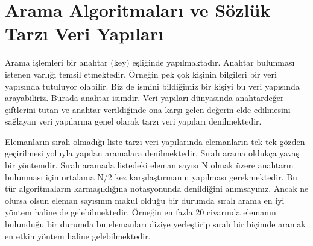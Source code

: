 \documentclass[a4paper,10pt,turkish]{sphinxmanual}
\begin{document}
\begin{sphinxVerbatim}[commandchars=\\\{\}]




\end{sphinxVerbatim}


\section{Arama Algoritmaları ve Sözlük Tarzı Veri Yapıları}
\label{\detokenize{kernellinkedlistandhashtable:arama-algoritmalari-ve-sozluk-tarzi-veri-yapilari}}
\sphinxAtStartPar
Arama işlemleri bir anahtar (key) eşliğinde yapılmaktadır. Anahtar bulunması istenen varlığı
temsil etmektedir. Örneğin pek çok kişinin bilgileri bir veri yapısında tutuluyor olabilir.
Biz de ismini bildiğimiz bir kişiyi bu veri yapısında arayabiliriz. Burada anahtar isimdir.
Veri yapıları dünyasında anahtar\sphinxhyphen{}değer çiftlerini tutan ve anahtar verildiğinde ona karşı
gelen değerin elde edilmesini sağlayan veri yapılarına genel olarak 
tarzı veri yapıları denilmektedir.

\sphinxAtStartPar
Elemanların sıralı olmadığı liste tarzı veri yapılarında elemanların tek tek gözden
geçirilmesi yoluyla yapılan aramalara  denilmektedir.
Sıralı arama oldukça yavaş bir yöntemdir. Sıralı aramada listedeki eleman sayısı N olmak
üzere anahtarın bulunması için ortalama N/2 kez karşılaştırmanın yapılması gerekmektedir.
Bu tür algoritmaların karmaşıklığına  notasyonunda  denildiğini
anımsayınız. Ancak ne olursa olsun eleman sayısının makul olduğu bir durumda sıralı arama
en iyi yöntem haline de gelebilmektedir. Örneğin en fazla 20 civarında elemanın bulunduğu
bir durumda bu elemanları diziye yerleştirip sıralı bir biçimde aramak en etkin yöntem
haline gelebilmektedir.
\end{document}

